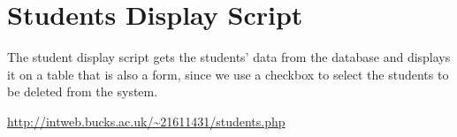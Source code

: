 \chapter{Students Display Script}
The student display script gets the students' data from the database and displays it on a table that is also a form, since we use a checkbox to select the students to be deleted from the system.

\url{http://intweb.bucks.ac.uk/~21611431/students.php}
\captionsetup{type=figure}

